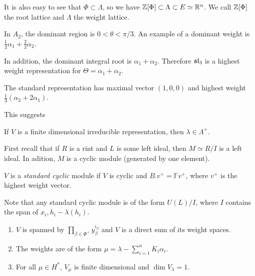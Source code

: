 \documentclass[twoside, 10pt]{article}
\newcommand{\F}{\mathbb{F}}
\begin{document}
    It is also easy to see that $\Phi \subset \Lambda$, so we have $\mathbb{Z}[\Phi]
    \subset \Lambda \subset E \simeq \mathbb{R}^n$. We call $\mathbb{Z}[\Phi]$ the root lattice
    and $\Lambda$ the weight lattice.

    \begin{exm} In $A_2$, the dominant region is $0 < \theta < \pi/3$. An
        example of a dominant weight is $\frac{1}{3} \alpha_1 + \frac{2}{3}
        \alpha_2$.

        In addition, the dominant integral root is $\alpha_1 + \alpha_2$.
        Therefore $\mathfrak{sl}_3$ is a highest weight representation for $\Theta =
        \alpha_1 + \alpha_2$.

        The standard representation has maximal vector $(1,0,0)$ and highest
    weight $\frac{1}{3} (\alpha_2 + 2 \alpha_1)$.  \end{exm}

    This suggests \begin{prop} If $V$ is a finite dimensional irreducible
    representation, then $\lambda \in \Lambda^+$.  \end{prop}
    
    First recall that if $R$ is a rint and $L$ is some left ideal, then $M
    \simeq R/I$ is a left ideal. In adition, $M$ is a cyclic module (generated
    by one element).  \begin{defn} $V$ is a \textit{standard cyclic} module if
        $V$ is cyclic and $B.v^+ = \F v^+$, where $v^+$ is the highest weight
        vector.  \end{defn} Note that any standard cyclic module is of the form
        $U(L)/I$, where $I$ contains the span of $x_i, h_i - \lambda(h_i)$.

    \begin{thm}
        \begin{enumerate}[label=(\alph*)] \item $V$ is spanned by $\prod_{\beta
            \in \Phi^+}y_{\beta}^{i_{\beta}}$ and $V$ is a direct sum of its
            weight spaces.  \item The weights are of the form $\mu = \lambda -
            \sum_{i=1}^n K_i \alpha_i$.  \item For all $\mu \in H^*$, $V_{\mu}$
    is finite dimensional and $\dim V_{\lambda} = 1$.  \end{enumerate}
\end{thm}
\end{document}
